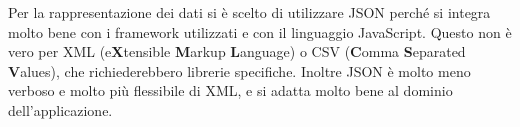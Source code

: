 Per la rappresentazione dei dati si è scelto di utilizzare JSON perché si integra molto bene con i framework utilizzati e con il linguaggio JavaScript. Questo non è vero per XML (e\textbf{X}tensible \textbf{M}arkup \textbf{L}anguage) o CSV (\textbf{C}omma \textbf{S}eparated \textbf{V}alues), che richiederebbero librerie specifiche. Inoltre JSON è molto meno verboso e molto più flessibile di XML, e si adatta molto bene al dominio dell'applicazione.